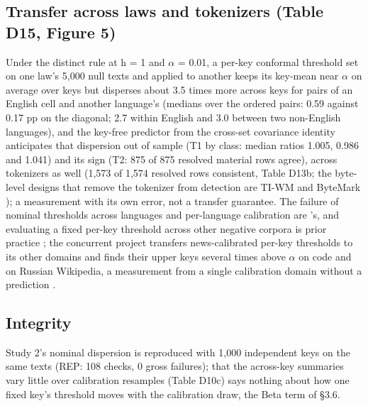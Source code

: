 \documentclass[11pt,letterpaper]{article}
\begin{document}
\hypertarget{transfer-across-laws-and-tokenizers-table-d15-figure-5}{%
\subsection{Transfer across laws and tokenizers (Table D15, Figure 5)}\label{transfer-across-laws-and-tokenizers-table-d15-figure-5}}

Under the distinct rule at h = 1 and \ensuremath{\alpha} = 0.01, a per-key conformal threshold set on one law's 5,000 null texts and applied to another keeps its key-mean near \ensuremath{\alpha} on average over keys but disperses about 3.5 times more across keys for pairs of an English cell and another language's (medians over the ordered pairs: 0.59 against 0.17 pp on the diagonal; 2.7 within English and 3.0 between two non-English languages), and the key-free predictor from the cross-set covariance identity anticipates that dispersion out of sample (T1 by class: median ratios 1.005, 0.986 and 1.041) and its sign (T2: 875 of 875 resolved material rows agree), across tokenizers as well (1,573 of 1,574 resolved rows consistent, Table D13b; the byte-level designs that remove the tokenizer from detection are TI-WM and ByteMark \citep{li2026tiwm, wang2026bytemark}); a measurement with its own error, not a transfer guarantee. The failure of nominal thresholds across languages and per-language calibration are \citet{nemecek2026crosslingual}'s, and evaluating a fixed per-key threshold across other negative corpora is prior practice \citep{xlr8harder2026synthid}; the concurrent project transfers news-calibrated per-key thresholds to its other domains and finds their upper keys several times above \ensuremath{\alpha} on code and on Russian Wikipedia, a measurement from a single calibration domain without a prediction \citep{yukhimchuk2026keylottery}.

\hypertarget{integrity}{%
\subsection{Integrity}\label{integrity}}

Study 2's nominal dispersion is reproduced with 1,000 independent keys on the same texts (REP: 108 checks, 0 gross failures); that the across-key summaries vary little over calibration resamples (Table D10c) says nothing about how one fixed key's threshold moves with the calibration draw, the Beta term of \S{}3.6.
\end{document}
